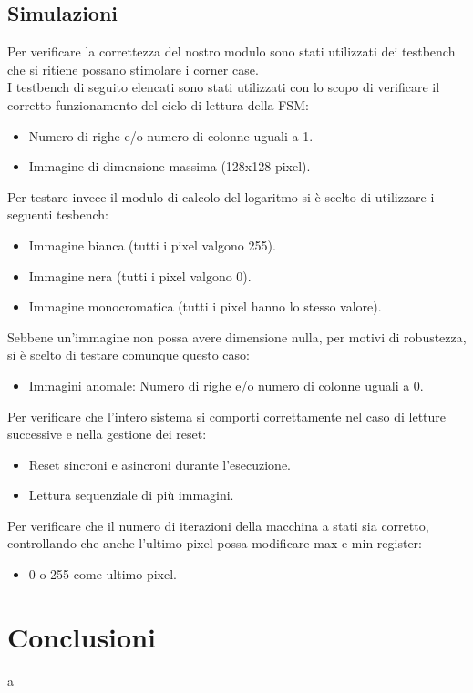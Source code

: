 \documentclass{article}
\begin{document}
\subsection{Simulazioni}
Per verificare la correttezza del nostro modulo sono stati utilizzati dei testbench che si ritiene possano stimolare i corner case.\\
I testbench di seguito elencati sono stati utilizzati con lo scopo di verificare il corretto funzionamento del ciclo di lettura della FSM:
\begin{itemize}
    \item Numero di righe e/o numero di colonne uguali a 1.
    \item Immagine di dimensione massima (128x128 pixel).
\end{itemize}
Per testare invece il modulo di calcolo del logaritmo si è scelto di utilizzare i seguenti tesbench:
\begin{itemize}
    \item Immagine bianca (tutti i pixel valgono 255).
    \item Immagine nera (tutti i pixel valgono 0).
    \item Immagine monocromatica (tutti i pixel hanno lo stesso valore).
\end{itemize}
Sebbene un'immagine non possa avere dimensione nulla, per motivi di robustezza, si è scelto di testare comunque questo caso:
\begin{itemize}
    \item Immagini anomale: Numero di righe e/o numero di colonne uguali a 0.
\end{itemize}
Per verificare che l'intero sistema si comporti correttamente nel caso di letture successive e nella gestione dei reset:
\begin{itemize}
    \item Reset sincroni e asincroni durante l'esecuzione.
\end{itemize}
\begin{itemize}
    \item Lettura sequenziale di più immagini.
\end{itemize}
Per verificare che il numero di iterazioni della macchina a stati sia corretto, controllando che anche l'ultimo pixel possa modificare max e min register:
\begin{itemize}
    \item 0 o 255 come ultimo pixel.
\end{itemize}
\section{Conclusioni}

a
\end{document}
